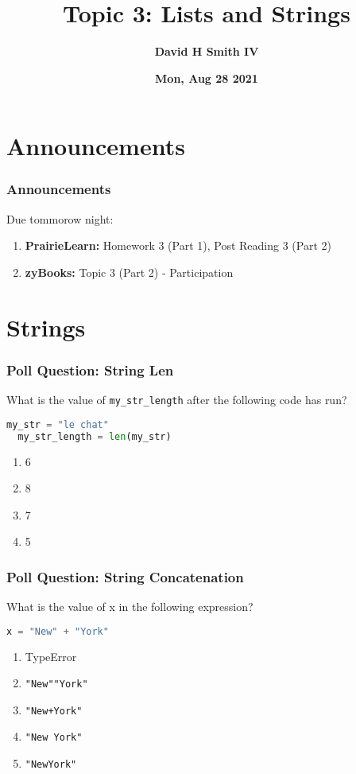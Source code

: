 \documentclass[xcolor=table]{beamer}
\title{\textbf{Topic 3: Lists and  Strings}}
\author{\textbf{David H Smith IV}}
\institute[\textbf{UIUC}]{\textbf{University of Illinois Urbana-Champaign}}
\date{\textbf{Mon, Aug 28 2021}}
\begin{document}
\frame{\titlepage}

\section{Announcements}

%
%
\begin{frame}
  \frametitle{Announcements}
  Due tommorow night:
  \begin{enumerate}
    \item \textbf{PrairieLearn: } Homework 3 (Part 1), Post Reading 3 (Part 2)
    \item \textbf{zyBooks: } Topic 3 (Part 2) - Participation
  \end{enumerate}
\end{frame}

\section{Strings}

%
%
\begin{frame}[fragile]
  \frametitle{Poll Question: String Len}
  What is the value of \lstinline|my_str_length| after the following code has run?
  \begin{lstlisting}[language=Python, autogobble] 
  my_str = "le chat"
  my_str_length = len(my_str)
  \end{lstlisting}
  \vfill
  \begin{enumerate}[A]
    \item 6
    \item 8
    \item 7 
    \item 5
  \end{enumerate}
\end{frame}

%
%
\begin{frame}[fragile]
  \frametitle{Poll Question: String Concatenation}
  What is the value of x in the following expression?
  \begin{lstlisting}[language=Python, autogobble] 
  x = "New" + "York"
  \end{lstlisting}
  \vfill
  \begin{enumerate}[A] 
    \item TypeError
    \item \lstinline{"New""York"} 
    \item \lstinline{"New+York"} 
    \item \lstinline{"New York"} 
    \item \lstinline{"NewYork"} 
  \end{enumerate}
\end{frame}
\end{document}
